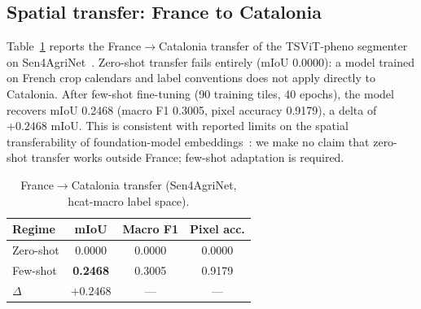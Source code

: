 \subsection{Spatial transfer: France to Catalonia}
\label{sec:results-transfer}
Table~\ref{tab:transfer} reports the France$\rightarrow$Catalonia
transfer of the TSViT-pheno segmenter on
Sen4AgriNet~\cite{sykas2022sen4agrinet}. Zero-shot transfer fails
entirely (mIoU 0.0000): a model trained on French crop calendars and
label conventions does not apply directly to Catalonia. After few-shot
fine-tuning (90 training tiles, 40 epochs), the model recovers mIoU
0.2468 (macro F1 0.3005, pixel accuracy 0.9179), a delta of $+0.2468$
mIoU. This is consistent with reported limits on the spatial
transferability of foundation-model
embeddings~\cite{harvesting2026alphaearth}: we make no claim that
zero-shot transfer works outside France; few-shot adaptation is
required.

\begin{table}[htbp]
\caption{France$\rightarrow$Catalonia transfer (Sen4AgriNet, hcat-macro
label space).}
\label{tab:transfer}
\centering
\begin{tabular}{lccc}
\toprule
\textbf{Regime} & \textbf{mIoU} & \textbf{Macro F1}
  & \textbf{Pixel acc.} \\
\midrule
Zero-shot  & 0.0000 & 0.0000 & 0.0000 \\
Few-shot   & \textbf{0.2468} & 0.3005 & 0.9179 \\
$\Delta$   & $+0.2468$ & --- & --- \\
\bottomrule
\end{tabular}
\end{table}


